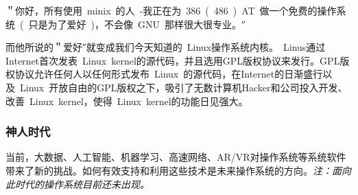 ＂你好，所有使用 minix 的人 -我正在为 386 ( 486 ) AT 做一个免费的操作系统 ( 只是为了爱好 )，不会像 GNU 那样很大很专业。″

而他所说的＂爱好″就变成我们今天知道的 Linux操作系统内核。 Linus通过Internet首次发表 Linux kernel的源代码，并且选用GPL版权协议来发行。GPL版权协议允许任何人以任何形式发布 Linux 的源代码，在Internet的日渐盛行以及 Linux 开放自由的GPL版权之下，吸引了无数计算机Hacker和公司投入开发、改善 Linux kernel，使得 Linux kernel的功能日见强大。 

\subsubsection{神人时代}

当前，大数据、人工智能、机器学习、高速网络、AR/VR对操作系统等系统软件带来了新的挑战。如何有效支持和利用这些技术是未来操作系统的方向。\emph{注：面向此时代的操作系统目前还未出现。}


